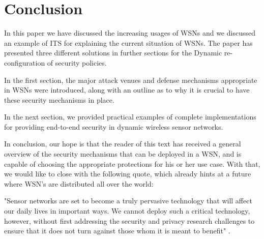\documentclass[12pt,a4paper,twoside]{report}
\begin{document}
\section{Conclusion}
\label{sec:conclusion}
In this paper we have discussed the increasing usages of WSNs and we discussed an example of ITS for explaining the current situation of WSNs. The paper has presented three different solutions in further sections for the Dynamic re-configuration of security policies.\par
In the first section, the major attack venues and defense mechanisms appropriate in WSNs were introduced, along with an outline as to why it is crucial to have these security mechanisms in place. \par
In the next section, we provided practical examples of complete implementations for providing end-to-end security in dynamic wireless sensor networks.\par
In conclusion, our hope is that the reader of this text has received a general overview of the security mechanisms that can be deployed in a WSN, and is capable of choosing the appropriate protections for his or her use case. With that, we would like to close with the following quote, which already hints at a future where WSN's are distributed all over the world: \par
"Sensor networks are set to become a truly pervasive technology that will affect our daily lives in important ways. We cannot deploy such a critical technology, however, without first addressing the security and privacy research challenges to ensure that it does not turn against those whom it is meant to benefit" \cite{chan;perrig:2003}.\par


\iffalse
\end{document}
